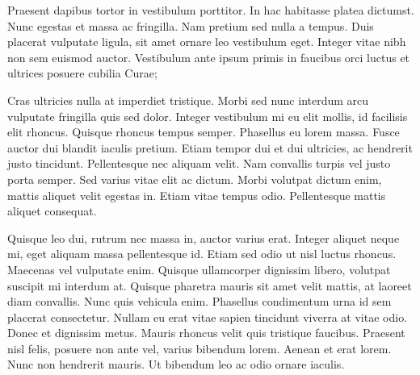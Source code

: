 \documentclass{article}
\begin{document}
Praesent dapibus tortor in vestibulum porttitor. In hac habitasse platea dictumst. Nunc egestas et massa ac fringilla. Nam pretium sed nulla a tempus. Duis placerat vulputate ligula, sit amet ornare leo vestibulum eget. Integer vitae nibh non sem euismod auctor. Vestibulum ante ipsum primis in faucibus orci luctus et ultrices posuere cubilia Curae;

Cras ultricies nulla at imperdiet tristique. Morbi sed nunc interdum arcu vulputate fringilla quis sed dolor. Integer vestibulum mi eu elit mollis, id facilisis elit rhoncus. Quisque rhoncus tempus semper. Phasellus eu lorem massa. Fusce auctor dui blandit iaculis pretium. Etiam tempor dui et dui ultricies, ac hendrerit justo tincidunt. Pellentesque nec aliquam velit. Nam convallis turpis vel justo porta semper. Sed varius vitae elit ac dictum. Morbi volutpat dictum enim, mattis aliquet velit egestas in. Etiam vitae tempus odio. Pellentesque mattis aliquet consequat.

Quisque leo dui, rutrum nec massa in, auctor varius erat. Integer aliquet neque mi, eget aliquam massa pellentesque id. Etiam sed odio ut nisl luctus rhoncus. Maecenas vel vulputate enim. Quisque ullamcorper dignissim libero, volutpat suscipit mi interdum at. Quisque pharetra mauris sit amet velit mattis, at laoreet diam convallis. Nunc quis vehicula enim. Phasellus condimentum urna id sem placerat consectetur. Nullam eu erat vitae sapien tincidunt viverra at vitae odio. Donec et dignissim metus. Mauris rhoncus velit quis tristique faucibus. Praesent nisl felis, posuere non ante vel, varius bibendum lorem. Aenean et erat lorem. Nunc non hendrerit mauris. Ut bibendum leo ac odio ornare iaculis.
\end{document}
